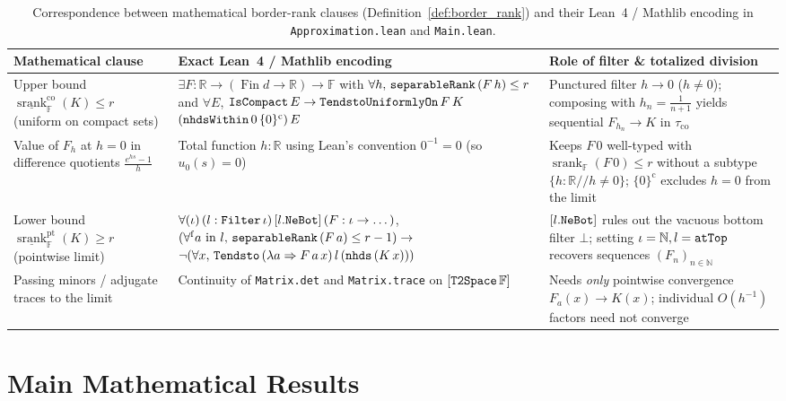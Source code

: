 \documentclass[11pt,a4paper]{article}
\theoremstyle{plain}
\theoremstyle{definition}
\newcommand{\R}{\mathbb{R}}
\newcommand{\N}{\mathbb{N}}
\newcommand{\Field}{\mathbb{F}}
\DeclareMathOperator{\srank}{srank}
\DeclareRobustCommand{\leanid}[1]{{\def\_{\textunderscore\allowbreak}\texttt{#1}}}
\begin{document}
\begin{table}[t]
\centering
\caption{Correspondence between mathematical border-rank clauses (Definition~\ref{def:border_rank}) and their Lean~4 / Mathlib encoding in \texttt{Approximation.lean} and \texttt{Main.lean}.}\label{tab:border_lean_map}
\smallskip
{\scriptsize\setlength{\tabcolsep}{2.2pt}
\begin{tabular}{@{}>{\raggedright\arraybackslash}p{3.3cm}>{\raggedright\arraybackslash}p{5.3cm}>{\raggedright\arraybackslash}p{5.7cm}@{}}
\toprule
Mathematical clause & Exact Lean~4 / Mathlib encoding & Role of filter \& totalized division \\
\midrule
Upper bound $\underline{\srank}_{\Field}^{\mathrm{co}}(K) \le r$ (uniform on compact sets) & $\exists F : \R \to (\operatorname{Fin} d \to \R) \to \Field$ with $\forall h,\, \leanid{separableRank}\,(F\,h) \le r$ and $\forall E$, $\leanid{IsCompact}\,E \to \leanid{TendstoUniformlyOn}\,F\,K$ $(\leanid{nhdsWithin}\,0\,\{0\}^{\mathrm{c}})\,E$ & Punctured filter $h \to 0$ ($h \ne 0$); composing with $h_n = \frac{1}{n+1}$ yields sequential $F_{h_n} \to K$ in $\tau_{\mathrm{co}}$ \\
Value of $F_h$ at $h = 0$ in difference quotients $\frac{e^{hs}-1}{h}$ & Total function $h : \R$ using Lean's convention $0^{-1} = 0$ (so $u_0(s) = 0$) & Keeps $F\,0$ well-typed with $\srank_{\Field}(F\,0) \le r$ without a subtype $\{h : \R // h \ne 0\}$; $\{0\}^{\mathrm{c}}$ excludes $h = 0$ from the limit \\
Lower bound $\underline{\srank}_{\Field}^{\mathrm{pt}}(K) \ge r$ (pointwise limit) & $\forall (\iota)\,(l : \leanid{Filter}\,\iota)\,[l.\leanid{NeBot}]\,(F : \iota \to \dots)$, $(\forall^{\mathrm{f}} a \text{ in } l,\, \leanid{separableRank}\,(F\,a) \le r - 1) \to$ $\neg(\forall x,\, \leanid{Tendsto}\,(\lambda a \Rightarrow F\,a\,x)\,l\,(\leanid{nhds}\,(K\,x)))$ & $[l.\leanid{NeBot}]$ rules out the vacuous bottom filter $\bot$; setting $\iota = \N, l = \leanid{atTop}$ recovers sequences $(F_n)_{n \in \N}$ \\
Passing minors / adjugate traces to the limit & Continuity of \leanid{Matrix.det} and \leanid{Matrix.trace} on $[\leanid{T2Space}\,\Field]$ & Needs \emph{only} pointwise convergence $F_a(x) \to K(x)$; individual $O(h^{-1})$ factors need not converge \\
\bottomrule
\end{tabular}}
\end{table}

\section{Main Mathematical Results}\label{sec:results}
\end{document}
